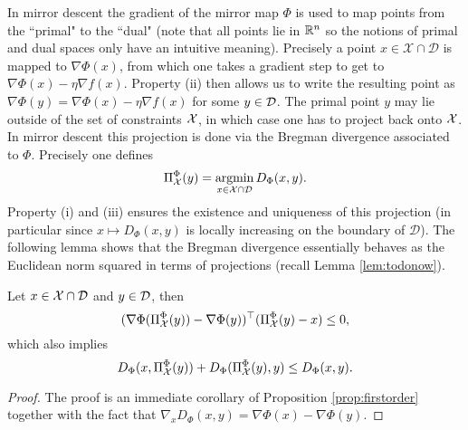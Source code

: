 In mirror descent the gradient of the mirror map $\Phi$ is used to map points from the ``primal" to the ``dual" (note that all points lie in $\mathbb{R}^n$ so the notions of primal and dual spaces only have an intuitive meaning). Precisely a point $x \in \mathcal{X} \cap \mathcal{D}$ is mapped to $\nabla \Phi(x)$, from which one takes a gradient step to get to $\nabla \Phi(x) - \eta \nabla f(x)$. Property (ii) then allows us to write the resulting point as $\nabla \Phi(y) = \nabla \Phi(x) - \eta \nabla f(x)$ for some $y \in \mathcal{D}$. The primal point $y$ may lie outside of the set of constraints $\mathcal{X}$, in which case one has to project back onto $\mathcal{X}$. In mirror descent this projection is done via the Bregman divergence associated to $\Phi$. Precisely one defines
$$\Pi_{\mathcal{X}}^{\Phi} (y) = \mathop{\mathrm{argmin}}_{x \in \mathcal{X} \cap \mathcal{D}} D_{\Phi}(x,y) .$$
Property (i) and (iii) ensures the existence and uniqueness of this projection (in particular since $x \mapsto D_{\Phi}(x,y)$ is locally increasing on the boundary of $\mathcal{D}$). The following lemma shows that the Bregman divergence essentially behaves as the Euclidean norm squared in terms of projections (recall Lemma \ref{lem:todonow}).

\begin{lemma} \label{lem:todonow2}
Let $x \in \mathcal{X} \cap \mathcal{D}$ and $y \in \mathcal{D}$, then
$$(\nabla \Phi(\Pi_{\mathcal{X}}^{\Phi}(y)) - \nabla \Phi(y))^{\top} (\Pi^{\Phi}_{\mathcal{X}}(y) - x) \leq 0 ,$$
which also implies 
$$D_{\Phi}(x, \Pi^{\Phi}_{\mathcal{X}}(y)) + D_{\Phi}(\Pi^{\Phi}_{\mathcal{X}}(y), y) \leq D_{\Phi}(x,y) .$$
\end{lemma}

\begin{proof}
The proof is an immediate corollary of Proposition \ref{prop:firstorder} together with the fact that $\nabla_x D_{\Phi}(x,y) = \nabla \Phi(x) - \nabla \Phi(y)$.
\end{proof}

